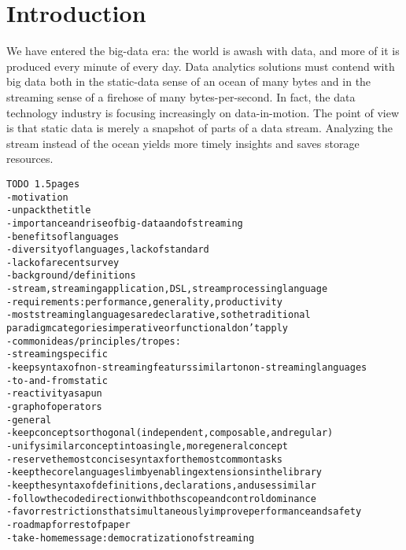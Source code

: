 \section{Introduction}\label{sec:introduction}

We have entered the big-data era: the world is awash with data, and
more of it is produced every minute of every day. Data analytics
solutions must contend with big data both in the static-data sense of
an ocean of many bytes and in the streaming sense of a firehose of
many bytes-per-second. In fact, the data technology industry is
focusing increasingly on data-in-motion.  The point of view is that
static data is merely a snapshot of parts of a data stream. Analyzing
the stream instead of the ocean yields more timely insights and saves
storage resources.

\begin{alltt}TODO\scriptsize ~1.5 pages
- motivation
  - unpack the title
  - importance and rise of big-data and of streaming
  - benefits of languages
  - diversity of languages, lack of standard
  - lack of a recent survey \cite{stephens_1997} \cite{johnston_hanna_millar_2004}
- background / definitions
  - stream, streaming application, DSL, stream processing language
  - requirements: performance, generality, productivity
  - most streaming languages are declarative, so the traditional
    paradigm categories imperative or functional don't apply
- common ideas/principles/tropes:
  - streaming specific
    - keep syntax of non-streaming featurs similar to non-streaming languages
    - to-and-from static
    - reactivity as a pun
    - graph of operators
  - general
    - keep concepts orthogonal (independent, composable, and regular)
    - unify similar concept into a single, more general concept
    - reserve the most concise syntax for the most common tasks
    - keep the core language slim by enabling extensions in the library
    - keep the syntax of definitions, declarations, and uses similar
    - follow the code direction with both scope and control dominance
    - favor restrictions that simultaneously improve performance and safety
- roadmap for rest of paper
- take-home message: democratization of streaming
\end{alltt}

